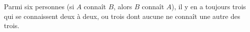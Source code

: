 Parmi six personnes (si $A$ connaît $B$, alors $B$ connaît $A$), il y en a
toujours trois qui se connaissent deux à deux, ou trois dont aucune ne connaît
une autre des trois.
